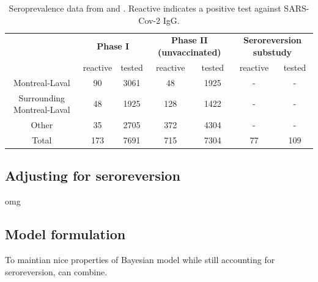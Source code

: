 \begin{table}[]
\centering
\begin{tabular}{c|cc|cc|cc}
                           & \multicolumn{2}{c}{\textbf{Phase I}} & \multicolumn{2}{c}{\textbf{Phase II (unvaccinated)}} & \multicolumn{2}{c}{\textbf{Seroreversion substudy}}\\
                           & reactive      & tested      & reactive              & tested      & reactive              & tested        \\
                           \hline
Montreal-Laval             & 90            & 3061        & 48                    & 1925      & - & -          \\
Surrounding Montreal-Laval & 48            & 1925        & 128                   & 1422   & - & -             \\
Other                      & 35            & 2705        & 372                   & 4304          & - & -      \\
\hline
Total                      & 173           & 7691        & 715                   & 7304          &    77 & 109  
\end{tabular}
\caption{Seroprevalence data from \cite{lewin2021sars} and \cite{lewin2022seroprevalence}. Reactive indicates a positive test against SARS-Cov-2 IgG.}
\label{tab:dat}
\end{table}
\subsection{Adjusting for seroreversion}
omg

\subsection{Model formulation}
To maintian nice properties of Bayesian model while still accounting for seroreversion, can combine.

